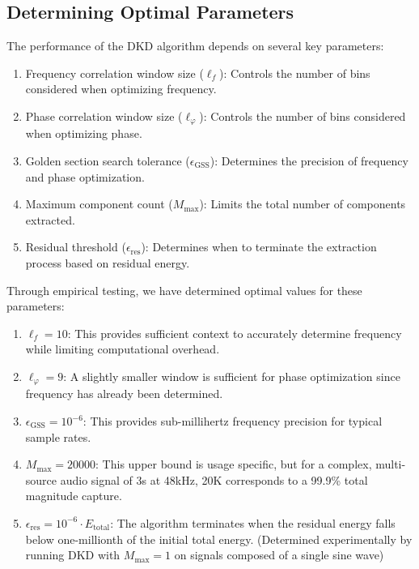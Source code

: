 \documentclass[11pt,twoside]{report}
\numberwithin{thm}{section}
\numberwithin{equation}{section}
\begin{document}
\subsection{Determining Optimal Parameters}
\label{subsubsec:determining_optimal_parameters}

The performance of the DKD algorithm depends on several key parameters:

\begin{enumerate}
    \item Frequency correlation window size ($\ell_f$): Controls the number of bins considered when optimizing frequency.
    \item Phase correlation window size ($\ell_\varphi$): Controls the number of bins considered when optimizing phase.
    \item Golden section search tolerance ($\epsilon_{\text{GSS}}$): Determines the precision of frequency and phase optimization.
    \item Maximum component count ($M_{\max}$): Limits the total number of components extracted.
    \item Residual threshold ($\epsilon_{\text{res}}$): Determines when to terminate the extraction process based on residual energy.
\end{enumerate}

Through empirical testing, we have determined optimal values for these parameters:

\begin{enumerate}
    \item $\ell_f = 10$: This provides sufficient context to accurately determine frequency while limiting computational overhead.
    \item $\ell_\varphi = 9$: A slightly smaller window is sufficient for phase optimization since frequency has already been determined.
    \item $\epsilon_{\text{GSS}} = 10^{-6}$: This provides sub-millihertz frequency precision for typical sample rates.
    \item $M_{\max} = 20000$: This upper bound is usage specific, but for a complex, multi-source audio signal of 3s at 48kHz, 20K corresponds to a 99.9\% total magnitude capture.
    \item $\epsilon_{\text{res}} = 10^{-6} \cdot E_{\text{total}}$: The algorithm terminates when the residual energy falls below one-millionth of the initial total energy. (Determined experimentally by running DKD with $M_{\max}=1$ on signals composed of a single sine wave)
\end{enumerate}
\end{document}
